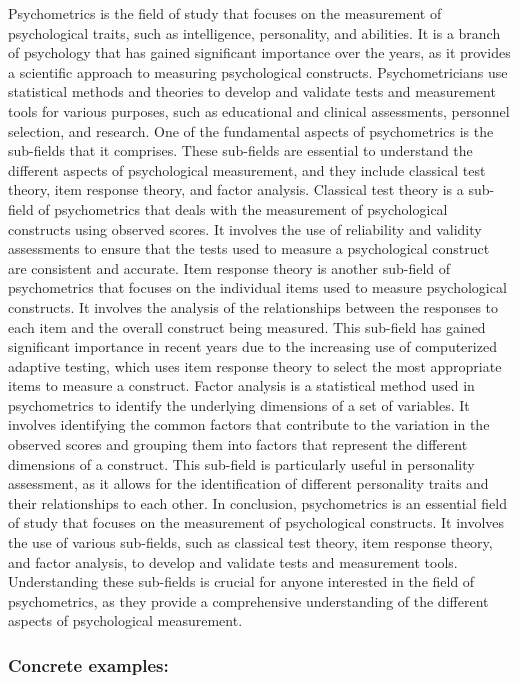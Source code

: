 \documentclass[
]{article}
\begin{document}
Psychometrics is the field of study that focuses on the measurement of
psychological traits, such as intelligence, personality, and abilities.
It is a branch of psychology that has gained significant importance over
the years, as it provides a scientific approach to measuring
psychological constructs. Psychometricians use statistical methods and
theories to develop and validate tests and measurement tools for various
purposes, such as educational and clinical assessments, personnel
selection, and research. One of the fundamental aspects of psychometrics
is the sub-fields that it comprises. These sub-fields are essential to
understand the different aspects of psychological measurement, and they
include classical test theory, item response theory, and factor
analysis. Classical test theory is a sub-field of psychometrics that
deals with the measurement of psychological constructs using observed
scores. It involves the use of reliability and validity assessments to
ensure that the tests used to measure a psychological construct are
consistent and accurate. Item response theory is another sub-field of
psychometrics that focuses on the individual items used to measure
psychological constructs. It involves the analysis of the relationships
between the responses to each item and the overall construct being
measured. This sub-field has gained significant importance in recent
years due to the increasing use of computerized adaptive testing, which
uses item response theory to select the most appropriate items to
measure a construct. Factor analysis is a statistical method used in
psychometrics to identify the underlying dimensions of a set of
variables. It involves identifying the common factors that contribute to
the variation in the observed scores and grouping them into factors that
represent the different dimensions of a construct. This sub-field is
particularly useful in personality assessment, as it allows for the
identification of different personality traits and their relationships
to each other. In conclusion, psychometrics is an essential field of
study that focuses on the measurement of psychological constructs. It
involves the use of various sub-fields, such as classical test theory,
item response theory, and factor analysis, to develop and validate tests
and measurement tools. Understanding these sub-fields is crucial for
anyone interested in the field of psychometrics, as they provide a
comprehensive understanding of the different aspects of psychological
measurement.

\hypertarget{concrete-examples}{%
\subsubsection{Concrete examples:}\label{concrete-examples}}
\end{document}

